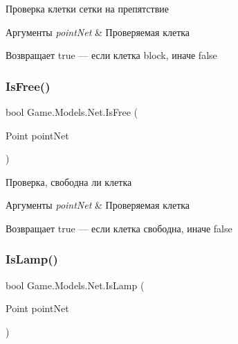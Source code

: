 Проверка клетки сетки на препятствие 


\begin{DoxyParams}{Аргументы}
{\em point\+Net} & Проверяемая клетка\\
\hline
\end{DoxyParams}
\begin{DoxyReturn}{Возвращает}
true — если клетка block, иначе false
\end{DoxyReturn}
\mbox{\label{class_game_1_1_models_1_1_net_a025aa070144c06dac4138815c40909ed}} 
\subsubsection{\texorpdfstring{Is\+Free()}{IsFree()}}
{\footnotesize\ttfamily bool Game.\+Models.\+Net.\+Is\+Free (\begin{DoxyParamCaption}\item[{Point}]{point\+Net }\end{DoxyParamCaption})}



Проверка, свободна ли клетка 


\begin{DoxyParams}{Аргументы}
{\em point\+Net} & Проверяемая клетка\\
\hline
\end{DoxyParams}
\begin{DoxyReturn}{Возвращает}
true — если клетка свободна, иначе false
\end{DoxyReturn}
\mbox{\label{class_game_1_1_models_1_1_net_a1a5c1a64772f796f40803bee2f529439}} 
\subsubsection{\texorpdfstring{Is\+Lamp()}{IsLamp()}}
{\footnotesize\ttfamily bool Game.\+Models.\+Net.\+Is\+Lamp (\begin{DoxyParamCaption}\item[{Point}]{point\+Net }\end{DoxyParamCaption})}



